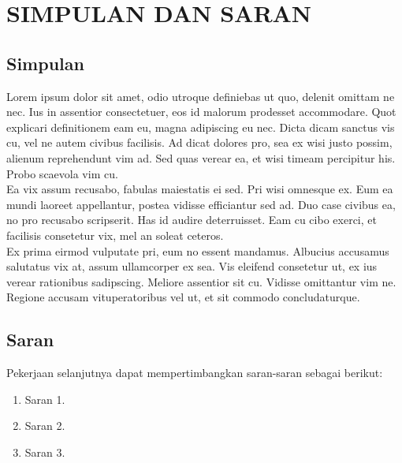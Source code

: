 \chapter{SIMPULAN DAN SARAN}
\vspace{1.0cm}

\section{Simpulan}
Lorem ipsum dolor sit amet, odio utroque definiebas ut quo, delenit omittam ne nec. Ius in assentior consectetuer, eos id malorum prodesset accommodare. Quot explicari definitionem eam eu, magna adipiscing eu nec. Dicta dicam sanctus vis cu, vel ne autem civibus facilisis. Ad dicat dolores pro, sea ex wisi justo possim, alienum reprehendunt vim ad. Sed quas verear ea, et wisi timeam percipitur his. Probo scaevola vim cu. \\

	Ea vix assum recusabo, fabulas maiestatis ei sed. Pri wisi omnesque ex. Eum ea mundi laoreet appellantur, postea vidisse efficiantur sed ad. Duo case civibus ea, no pro recusabo scripserit. Has id audire deterruisset. Eam cu cibo exerci, et facilisis consetetur vix, mel an soleat ceteros.\\
	
	Ex prima eirmod vulputate pri, eum no essent mandamus. Albucius accusamus salutatus vix at, assum ullamcorper ex sea. Vis eleifend consetetur ut, ex ius verear rationibus sadipscing. Meliore assentior sit cu. Vidisse omittantur vim ne. Regione accusam vituperatoribus vel ut, et sit commodo concludaturque.\\
	

\section{Saran}
Pekerjaan selanjutnya dapat mempertimbangkan saran-saran sebagai berikut:
\begin{enumerate}
\item Saran 1. 
\item Saran 2.
\item Saran 3. 
\end{enumerate}